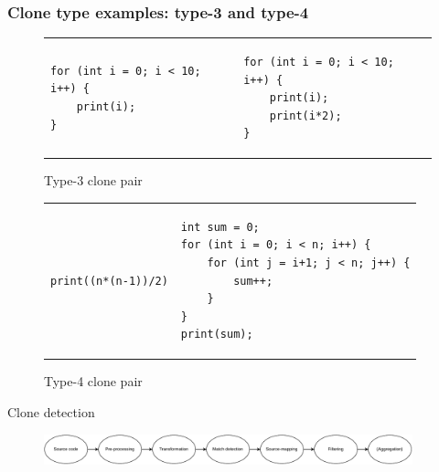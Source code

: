 \documentclass[aspectratio=1610, xcolor=table]{beamer}
\begin{document}
\begin{frame}[fragile]
	\frametitle{Clone type examples: type-3 and type-4}
    \vspace{0.5cm}
	\begin{figure}[t]
		\begin{center}
			\begin{tabular}{p{6cm} | p{6cm}}
				\begin{lstlisting}
for (int i = 0; i < 10; i++) {
    print(i);
}\end{lstlisting} &
				\begin{lstlisting}
for (int i = 0; i < 10; i++) {
    print(i);
    print(i*2);
}\end{lstlisting}
			\end{tabular}
		\end{center}
		\caption{Type-3 clone pair}
		\label{fig:type3clone}
	\end{figure}
    \vspace{-0.5cm}

	\begin{figure}[t]
		\begin{center}
			\begin{tabular}{r | p{6.5cm}}
				\hspace{3.2cm}\begin{lstlisting}
print((n*(n-1))/2)
\end{lstlisting} &
				\begin{lstlisting}
int sum = 0;
for (int i = 0; i < n; i++) {
    for (int j = i+1; j < n; j++) {
        sum++;
    }
}
print(sum);
            \end{lstlisting}
			\end{tabular}
		\end{center}
		\caption{Type-4 clone pair}
		\label{fig:type4clone}
	\end{figure}
\end{frame}

\begin{frame}{Clone detection}
    \begin{figure}
        \begin{center}
            \includegraphics[width=0.95\textwidth]{figures/detectionphases.drawio.pdf}
        \end{center}
    \end{figure}
\end{frame}
\end{document}
